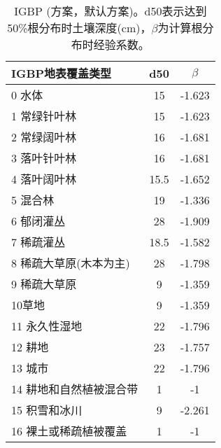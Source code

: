 \begin{table}[]
    \centering
    \caption{IGBP (\citet{schenk2002rooting}方案，默认方案)。d50表示达到50\%根分布时土壤深度(cm)，$\beta$为计算根分布时经验系数。}
    \label{tab:IGBPSchenkANDJackson2002方案默认方案}
    \begin{tabular}{@{}lcc@{}}
    \toprule
    IGBP地表覆盖类型     & d50  & $\beta$ \\ \midrule
    0 水体          & 15   & -1.623 \\  
    1 常绿针叶林       & 15   & -1.623 \\
    2 常绿阔叶林       & 16   & -1.681 \\
    3 落叶针叶林       & 16   & -1.681 \\
    4 落叶阔叶林       & 15.5 & -1.652 \\
    5 混合林         & 19   & -1.336 \\
    6 郁闭灌丛        & 28   & -1.909 \\
    7 稀疏灌丛        & 18.5 & -1.582 \\
    8 稀疏大草原(木本为主) & 28   & -1.798 \\
    9 稀疏大草原       & 9    & -1.359 \\
    10草地          & 9    & -1.359 \\
    11 永久性湿地      & 22   & -1.796 \\
    12 耕地         & 23   & -1.757 \\
    13 城市         & 22   & -1.796 \\
    14 耕地和自然植被混合带 & 1    & -1     \\
    15 积雪和冰川      & 9    & -2.261 \\
    16 裸土或稀疏植被覆盖  & 1    & -1     \\ \bottomrule
\end{tabular}
\end{table}


